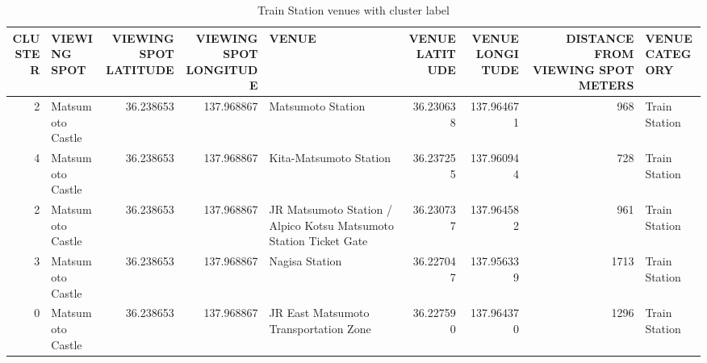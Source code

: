 \begin{table}[h]
\tiny
\centering
\caption{Train Station venues with cluster label}
\begin{tabular}{rlrrlrrrl}
\toprule
 CLUSTER & VIEWING SPOT     &  VIEWING SPOT LATITUDE &  VIEWING SPOT LONGITUDE & VENUE                                                             &  VENUE LATITUDE &  VENUE LONGITUDE &  DISTANCE FROM VIEWING SPOT METERS & VENUE CATEGORY \\
\midrule
2        & Matsumoto Castle & 36.238653              & 137.968867              &                                                 Matsumoto Station & 36.230638       & 137.964671       &  968                               & Train Station  \\
4        & Matsumoto Castle & 36.238653              & 137.968867              &                                            Kita-Matsumoto Station & 36.237255       & 137.960944       &  728                               & Train Station  \\
2        & Matsumoto Castle & 36.238653              & 137.968867              & JR Matsumoto Station / Alpico Kotsu Matsumoto Station Ticket Gate & 36.230737       & 137.964582       &  961                               & Train Station  \\
3        & Matsumoto Castle & 36.238653              & 137.968867              &                                                    Nagisa Station & 36.227047       & 137.956339       & 1713                               & Train Station  \\
0        & Matsumoto Castle & 36.238653              & 137.968867              &                             JR East Matsumoto Transportation Zone & 36.227590       & 137.964370       & 1296                               & Train Station  \\
\bottomrule
\end{tabular}
\end{table}

